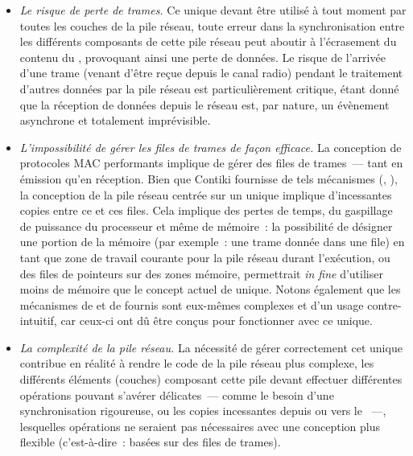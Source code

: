 \begin{itemize}

\item \emph{Le risque de perte de trames.} Ce  unique devant
être utilisé à tout moment par toutes les couches de la pile réseau, toute
erreur dans la synchronisation entre les différents composants de cette
pile réseau peut aboutir à l'écrasement du contenu du ,
provoquant ainsi une perte de données. Le risque de l'arrivée d'une trame
(venant d'être reçue depuis le canal radio) pendant le traitement d'autres
données par la pile réseau est particulièrement critique, étant donné que
la réception de données depuis le réseau est, par nature, un évènement
asynchrone et totalement imprévisible.

\item \emph{L'impossibilité de gérer les files de trames de façon efficace.}
La conception de protocoles MAC performants implique de gérer des files
de trames~--- tant en émission qu'en réception. Bien que Contiki fournisse
de tels mécanismes (, ), la
conception de la pile réseau centrée sur un unique 
implique d'incessantes copies entre ce  et ces files.
Cela implique des pertes de temps, du gaspillage de puissance du processeur
et même de mémoire~: la possibilité de désigner une portion de la mémoire
(par exemple~: une trame donnée dans une file) en tant que zone de travail
courante pour la pile réseau durant l'exécution, ou des files de pointeurs
sur des zones mémoire, permettrait \textit{in fine} d'utiliser moins de
mémoire que le concept actuel de  unique. Notons également
que les mécanismes de  et de 
fournis sont eux-mêmes complexes et d'un usage contre-intuitif, car
ceux-ci ont dû être conçus pour fonctionner avec ce  unique.

\item \emph{La complexité de la pile réseau.} La nécessité de gérer
correctement cet unique  contribue en réalité à rendre
le code de la pile réseau plus complexe, les différents éléments (couches)
composant cette pile devant effectuer différentes opérations pouvant
s'avérer délicates~--- comme le besoin d'une synchronisation rigoureuse,
ou les copies incessantes depuis ou vers le ~---, lesquelles
opérations ne seraient pas nécessaires avec une conception plus flexible
(c'est-à-dire~: basées sur des files de trames).

\end{itemize}

